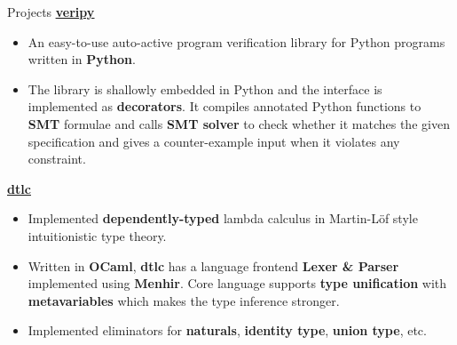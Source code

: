 \documentclass{resume}
\newcommand{\myul}[2][blue]{\setulcolor{#1}\ul{#2}\setulcolor{blue}}
\begin{document}
\begin{rSection}{Projects}
		\textbf{\href{https://github.com/AD1024/veripy}{\color{blue} \myul{veripy}}} %
		\vspace{-5pt}

		\begin{itemize}
			\setlength{\itemsep}{1pt}
            \setlength{\parskip}{0pt}
			\setlength{\parsep}{0pt}
			\item An easy-to-use auto-active program verification library for Python programs written in \textbf{Python}.
			\item The library is shallowly embedded in Python and the interface is implemented as \textbf{decorators}. It compiles annotated Python functions to \textbf{SMT} formulae and calls \textbf{SMT solver} to check whether it matches the given specification and gives a counter-example input when it violates any constraint.
		\end{itemize}

		\textbf{\href{https://github.com/AD1024/dtlc}{\color{blue} \myul{dtlc}}} %
		\vspace{-5pt}

		\begin{itemize}
			\setlength{\itemsep}{1pt}
            \setlength{\parskip}{0pt}
			\setlength{\parsep}{0pt}
			\item Implemented \textbf{dependently-typed} lambda calculus in Martin-Löf style intuitionistic type theory.
			\item Written in \textbf{OCaml}, \textbf{dtlc} has a language frontend \textbf{Lexer \& Parser} implemented using \textbf{Menhir}. Core language supports \textbf{type unification} with \textbf{metavariables} which makes the type inference stronger.
			\item Implemented eliminators for \textbf{naturals}, \textbf{identity type}, \textbf{union type}, etc.
		\end{itemize}


\end{rSection}
\end{document}
